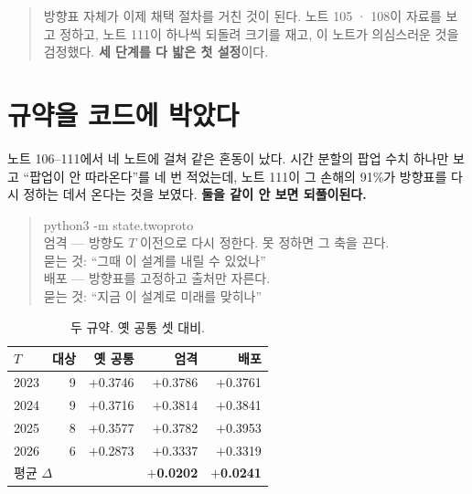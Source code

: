 \documentclass[10pt]{article}
\begin{document}

\begin{quote}\fontsize{9.5}{11.5}\selectfont
방향표 자체가 이제 채택 절차를 거친 것이 된다. 노트 105 · 108이 자료를 보고
정하고, 노트 111이 하나씩 되돌려 크기를 재고, 이 노트가 의심스러운 것을
검정했다. \textbf{세 단계를 다 밟은 첫 설정}이다.
\end{quote}

\section{규약을 코드에 박았다}

노트 106--111에서 네 노트에 걸쳐 같은 혼동이 났다. 시간 분할의 팝업 수치
하나만 보고 ``팝업이 안 따라온다''를 네 번 적었는데, 노트 111이 그 손해의
91\%가 방향표를 다시 정하는 데서 온다는 것을 보였다. \textbf{둘을 같이 안
보면 되풀이된다.}

\begin{quote}\fontsize{9.0}{11}\selectfont\ttfamily
python3 -m state.twoproto\\[.4em]
\rm 엄격 --- 방향도 $T$ 이전으로 다시 정한다. 못 정하면 그 축을 끈다.\\
\rm\hphantom{엄격 --- }묻는 것: ``그때 이 설계를 내릴 수 있었나''\\[.2em]
\rm 배포 --- 방향표를 고정하고 출처만 자른다.\\
\rm\hphantom{배포 --- }묻는 것: ``지금 이 설계로 미래를 맞히나''
\end{quote}

\begin{table}[t]
\centering\tsize
\caption{두 규약. 옛 공통 셋 대비.}
\begin{tabular}{lrrrr}
\toprule
$T$ & 대상 & 옛 공통 & 엄격 & 배포 \\
\midrule
2023 & 9 & $+$0.3746 & $+$0.3786 & $+$0.3761 \\
2024 & 9 & $+$0.3716 & $+$0.3814 & $+$0.3841 \\
2025 & 8 & $+$0.3577 & $+$0.3782 & $+$0.3953 \\
2026 & 6 & $+$0.2873 & $+$0.3337 & $+$0.3319 \\
\midrule
\multicolumn{3}{l}{평균 $\Delta$} & \textbf{$+$0.0202} & \textbf{$+$0.0241} \\
\bottomrule
\end{tabular}
\end{table}
\end{document}
